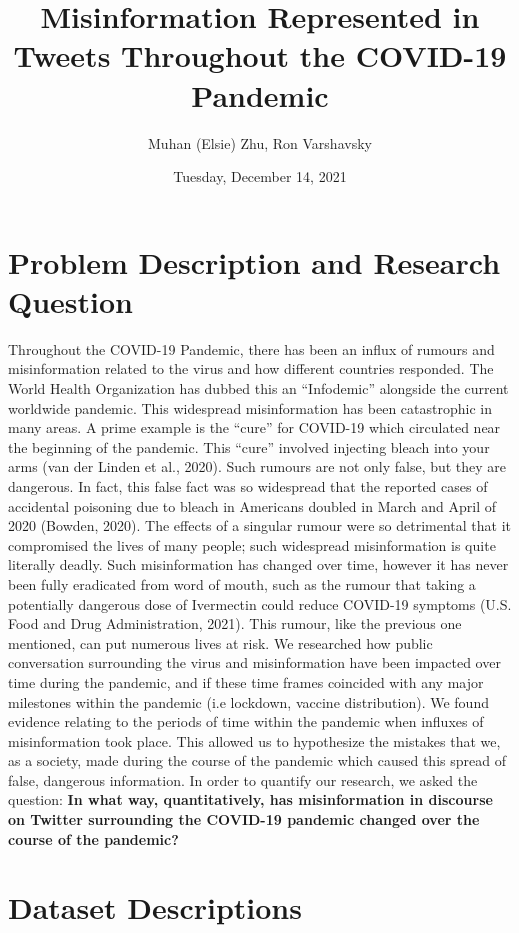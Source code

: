 \documentclass[fontsize=11pt]{article}
\title{Misinformation Represented in Tweets Throughout the COVID-19 Pandemic}
\author{Muhan (Elsie) Zhu, Ron Varshavsky}
\date{Tuesday, December 14, 2021}
\begin{document}
    \maketitle

    \section*{Problem Description and Research Question}

    Throughout the COVID-19 Pandemic, there has been an influx of rumours and misinformation related to the virus and how different countries responded. The World Health Organization has dubbed this an ``Infodemic” alongside the current worldwide pandemic. This widespread misinformation has been catastrophic in many areas. A prime example is the “cure” for COVID-19 which circulated near the beginning of the pandemic. This ``cure” involved injecting bleach into your arms (van der Linden et al., 2020). Such rumours are not only false, but they are dangerous. In fact, this false fact was so widespread that the reported cases of accidental poisoning due to bleach in Americans doubled in March and April of 2020 (Bowden, 2020). The effects of a singular rumour were so detrimental that it compromised the lives of many people; such widespread misinformation is quite literally deadly. Such misinformation has changed over time, however it has never been fully eradicated from word of mouth, such as the rumour that taking a potentially dangerous dose of Ivermectin could reduce COVID-19 symptoms (U.S. Food and Drug Administration, 2021). This rumour, like the previous one mentioned, can put numerous lives at risk. We researched how public conversation surrounding the virus and misinformation have been impacted over time during the pandemic, and if these time frames coincided with any major milestones within the pandemic (i.e lockdown, vaccine distribution). We found evidence relating to the periods of time within the pandemic when influxes of misinformation took place. This allowed us to hypothesize the mistakes that we, as a society, made during the course of the pandemic which caused this spread of false, dangerous information. In order to quantify our research, we asked the question: \textbf{In what way, quantitatively, has misinformation in discourse on Twitter surrounding the COVID-19 pandemic changed over the course of the pandemic?}

    \section*{Dataset Descriptions}
\end{document}
